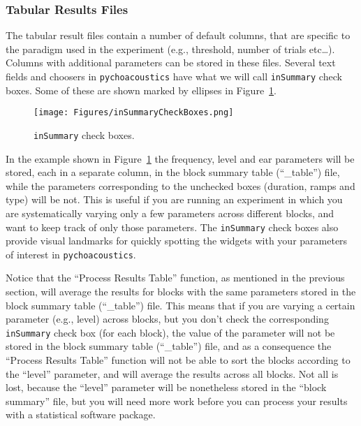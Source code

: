 \subsubsection{Tabular Results Files}
\label{sec:tabular_results_files}
The tabular result files contain a number of default columns, that are 
specific to the paradigm used in the experiment (e.g., threshold, number of trials etc\ldots). 
Columns with additional parameters can be stored in these files. Several text fields and 
choosers in \texttt{pychoacoustics} have what we will call \texttt{inSummary} check boxes. 
Some of these are shown marked by ellipses in Figure~\ref{fig:inSummaryCheckBoxes}.
 \begin{figure}[!h]
   \caption{\texttt{inSummary} check boxes.}
   \centering
   \texttt{[image: Figures/inSummaryCheckBoxes.png]}
   \label{fig:inSummaryCheckBoxes}
 \end{figure}
 In the example shown in Figure~\ref{fig:inSummaryCheckBoxes} the frequency, level and ear 
parameters will be stored, each in a separate column, in the block summary table (``\_table'') 
file, while the parameters corresponding to the unchecked boxes (duration, ramps and type) will be not. 
This is useful if you are running an experiment in which you are systematically 
varying only a few parameters across different blocks, and want to keep track of 
only those parameters. The \texttt{inSummary} check boxes also provide visual 
landmarks for quickly spotting the widgets with your parameters of interest in \texttt{pychoacoustics}.

Notice that the ``Process Results Table'' function, as mentioned in the previous 
section, will average the results for blocks with the same parameters 
stored in the block summary table (``\_table'') file.
This means that if you are varying a certain parameter (e.g., level) 
across blocks, but you don't check the corresponding \texttt{inSummary} check box (for each block), the value
of the parameter will not be stored in the block summary table (``\_table'') file, 
and as a consequence the ``Process Results Table'' function will not be able 
to sort the blocks according to the ``level'' parameter, and will average the 
results across all blocks. Not all is lost, because the ``level'' parameter will be nonetheless stored in the
``block summary'' file, but you will need more work before you can process your results with a statistical software package.

